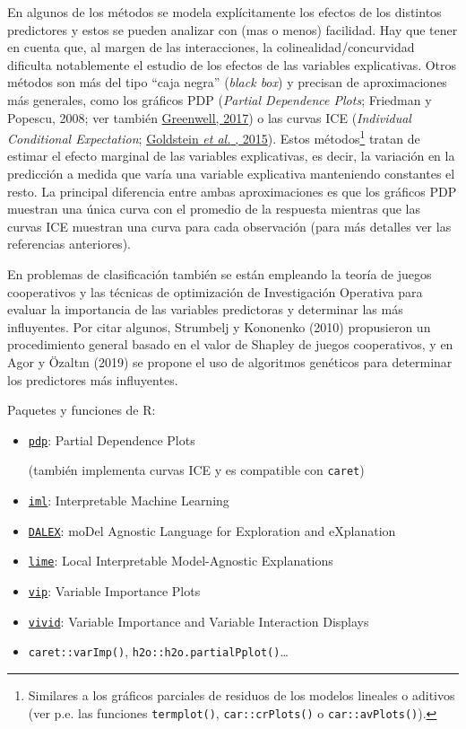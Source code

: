 \documentclass[
]{book}
\theoremstyle{break}
\theoremstyle{definition}
\theoremstyle{definition}
\theoremstyle{definition}
\theoremstyle{definition}
\theoremstyle{remark}
\begin{document}
En algunos de los métodos se modela explícitamente los efectos de los distintos predictores y estos se pueden analizar con (mas o menos) facilidad.
Hay que tener en cuenta que, al margen de las interacciones, la colinealidad/concurvidad dificulta notablemente el estudio de los efectos de las variables explicativas.
Otros métodos son más del tipo ``caja negra'' (\emph{black box}) y precisan de aproximaciones más generales, como los gráficos PDP (\emph{Partial Dependence Plots}; Friedman y Popescu, 2008; ver también \href{https://journal.r-project.org/archive/2017/RJ-2017-016/index.html}{Greenwell, 2017}) o las curvas ICE (\emph{Individual Conditional Expectation}; \href{https://doi.org/10.1080/10618600.2014.907095}{Goldstein \emph{et al.} , 2015}).
Estos métodos\footnote{Similares a los gráficos parciales de residuos de los modelos lineales o aditivos (ver p.e. las funciones \texttt{termplot()}, \texttt{car::crPlots()} o \texttt{car::avPlots()}).} tratan de estimar el efecto marginal de las variables explicativas, es decir, la variación en la predicción a medida que varía una variable explicativa manteniendo constantes el resto.
La principal diferencia entre ambas aproximaciones es que los gráficos PDP muestran una única curva con el promedio de la respuesta mientras que las curvas ICE muestran una curva para cada observación (para más detalles ver las referencias anteriores).

En problemas de clasificación también se están empleando la teoría de juegos cooperativos y las técnicas de optimización de Investigación Operativa para evaluar la importancia de las variables predictoras y determinar las más influyentes.
Por citar algunos, Strumbelj y Kononenko (2010) propusieron un procedimiento general basado en el valor de Shapley de juegos cooperativos, y en Agor y Özaltın (2019) se propone el uso de algoritmos genéticos para determinar los predictores más influyentes.

Paquetes y funciones de R:

\begin{itemize}
\item
  \href{https://bgreenwell.github.io/pdp/index.html}{\texttt{pdp}}: Partial Dependence Plots

  (también implementa curvas ICE y es compatible con \texttt{caret})
\item
  \href{https://christophm.github.io/iml}{\texttt{iml}}: Interpretable Machine Learning
\item
  \href{https://modeloriented.github.io/DALEX}{\texttt{DALEX}}: moDel Agnostic Language for Exploration and eXplanation
\item
  \href{https://lime.data-imaginist.com}{\texttt{lime}}: Local Interpretable Model-Agnostic Explanations
\item
  \href{https://koalaverse.github.io/vip/index.html}{\texttt{vip}}: Variable Importance Plots
\item
  \href{https://github.com/AlanInglis/vivid}{\texttt{vivid}}: Variable Importance and Variable Interaction Displays
\item
  \texttt{caret::varImp()}, \texttt{h2o::h2o.partialPplot()}\ldots{}
\end{itemize}
\end{document}
